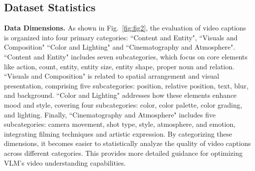 \subsection{Dataset Statistics}
\textbf{Data Dimensions.} As shown in Fig.~\ref{fig:fig2}, the evaluation of video captions is organized into four primary categories: ``Content and Entity", ``Visuals and Composition" ``Color and Lighting" and ``Cinematography and Atmosphere". ``Content and Entity" includes seven subcategories, which focus on core elements like action, count, entity, entity size, entity shape, proper noun and relation. ``Visuals and Composition" is related to spatial arrangement and visual presentation, comprising five subcategories: position, relative position, text, blur, and background. ``Color and Lighting" addresses how these elements enhance mood and style, covering four subcategories: color, color palette, color grading, and lighting. Finally, ``Cinematography and Atmosphere" includes five subcategories: camera movement, shot type, style, atmosphere, and emotion, integrating filming techniques and artistic expression.  By categorizing these dimensions, it becomes easier to statistically analyze the quality of video  captions across different categories. This provides more detailed guidance for optimizing VLM's video understanding capabilities.

